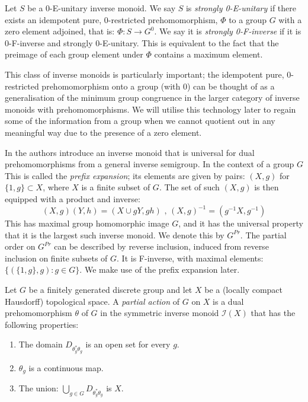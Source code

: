 \begin{definition}
Let $S$ be a 0-E-unitary inverse monoid. We say $S$ is \textit{strongly 0-E-unitary} if there exists an idempotent pure, 0-restricted prehomomorphism, $\Phi$ to a group $G$ with a zero element adjoined, that is: $\Phi:S \rightarrow G^{0}$. We say it is \textit{strongly 0-F-inverse} if it is 0-F-inverse and strongly 0-E-unitary. This is equivalent to the fact that the preimage of each group element under $\Phi$ contains a maximum element.
\end{definition}

This class of inverse monoids is particularly important; the idempotent pure, 0-restricted prehomomorphism onto a group (with 0) can be thought of as a generalisation of the minimum group congruence in the larger category of inverse monoids with prehomomorphisms. We will utilise this technology later to regain some of the information from a group when we cannot quotient out in any meaningful way due to the presence of a zero element.

\begin{example}
In \cite{MR745358,MR2221438} the authors introduce an inverse monoid that is universal for dual prehomomorphisms from a general inverse semigroup. In the context of a group $G$ This is called the \textit{prefix expansion}; its elements are given by pairs: $(X,g)$ for $\lbrace 1,g\rbrace \subset X$, where $X$ is a finite subset of $G$. The set of such $(X,g)$ is then equipped with a product and inverse:
\begin{equation*}
(X,g)(Y,h) = (X\cup gY,gh)\mbox{ , } (X,g)^{-1}=(g^{-1}X,g^{-1})
\end{equation*}
This has maximal group homomorphic image $G$, and it has the universal property that it is the largest such inverse monoid. We denote this by $G^{Pr}$. The partial order on $G^{Pr}$ can be described by reverse inclusion, induced from reverse inclusion on finite subsets of $G$. It is F-inverse, with maximal elements: $\lbrace(\lbrace 1,g \rbrace, g):g \in G \rbrace$. We make use of the prefix expansion later.
\end{example}

\begin{definition}
Let $G$ be a finitely generated discrete group and let $X$ be a (locally compact Hausdorff) topological space. A \textit{partial action} of $G$ on $X$ is a dual prehomomorphism $\theta$ of $G$ in the symmetric inverse monoid $\mathcal{I}(X)$ that has the following properties:
\begin{enumerate}
\item The domain $D_{\theta_{g}^{*}\theta_{g}}$ is an open set for every $g$.
\item $\theta_{g}$ is a continuous map.
\item The union: $\bigcup_{g \in G}D_{\theta_{g}^{*}\theta_{g}}$ is $X$.
\end{enumerate}
\end{definition}

